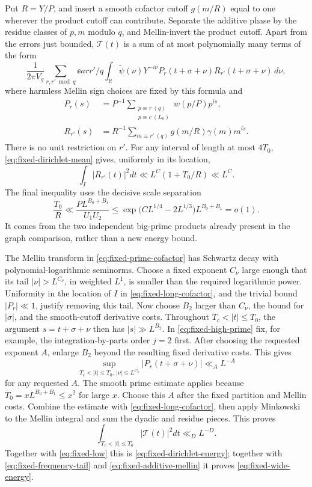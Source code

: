 Put \(R=Y/P\), and insert a smooth cofactor cutoff
\(g(m/R)\) equal to one wherever the product cutoff can contribute.
Separate the additive phase by the residue classes of \(p,m\)
modulo \(q\), and Mellin-invert the product cutoff. Apart from
the errors just bounded, \(\mathcal T(t)\) is a sum of at most
polynomially many terms of the form
\begin{equation}\label{eq:fixed-prime-cofactor}
 \frac{1}{2\pi V_g}\sum_{r,r'\bmod q}\ee{arr'/q}
       \int_{\mathbb R}\widetilde\psi(\nu)Y^{-i\nu}
          P_r(t+\sigma+\nu)R_{r'}(t+\sigma+\nu)\,d\nu,
\end{equation}
where harmless Mellin sign choices are fixed by this formula and
\[
 \begin{split}
 P_r(s)&=P^{-1}\sum_{\substack{p\equiv r\ (q)\\p\equiv c\ (L_0)}}
                    w(p/P)p^{is},\\
 R_{r'}(s)&=R^{-1}\sum_{m\equiv r'\ (q)}
                      g(m/R)\gamma(m)m^{is}.
 \end{split}
\]
There is no unit restriction on \(r'\). For any interval of
length at most \(4T_0\), \eqref{eq:fixed-dirichlet-mean} gives,
uniformly in its location,
\begin{equation}\label{eq:fixed-long-cofactor}
       \int_I|R_{r'}(t)|^2dt\ll L^C(1+T_0/R)\ll L^C.
\end{equation}
The final inequality uses the decisive scale separation
\[
 \frac{T_0}{R}\ll\frac{P L^{B_0+B_1}}{U_1U_2}
   \le\exp\bigl(CL^{1/4}-2L^{1/3}\bigr)L^{B_0+B_1}=o(1).
\]
It comes from the two independent big-prime products already
present in the graph comparison, rather than a new energy bound.

The Mellin transform in \eqref{eq:fixed-prime-cofactor} has
Schwartz decay with polynomial-logarithmic seminorms. Choose a
fixed exponent \(C_\nu\) large enough that its tail
\(|\nu|>L^{C_\nu}\), in weighted \(L^1\), is smaller than the
required logarithmic power. Uniformity in the location of \(I\)
in \eqref{eq:fixed-long-cofactor}, and the trivial bound
\(|P_r|\ll1\), justify removing this tail. Now choose \(B_2\)
larger than \(C_\nu\), the bound for \(|\sigma|\), and the
smooth-cutoff derivative costs. Throughout
\(T_c<|t|\le T_0\), the argument
\(s=t+\sigma+\nu\) then has \(|s|\gg L^{B_2}\).
In \eqref{eq:fixed-high-prime} fix, for example, the
integration-by-parts order \(j=2\) first. After choosing the
requested exponent \(A\), enlarge \(B_2\) beyond the resulting
fixed derivative costs. This gives
\[
           \sup_{T_c<|t|\le T_0,\ |\nu|\le L^{C_\nu}}
                    |P_r(t+\sigma+\nu)|\ll_A L^{-A}
\]
for any requested \(A\). The smooth prime estimate applies
because \(T_0=xL^{B_0+B_1}\le x^2\) for large \(x\).
Choose this \(A\) after the fixed partition and Mellin costs.
Combine the estimate with \eqref{eq:fixed-long-cofactor}, then apply
Minkowski to the Mellin integral and sum the dyadic and residue
pieces. This proves
\[
              \int_{T_c<|t|\le T_0}|\mathcal T(t)|^2dt\ll_D L^{-D}.
\]
Together with \eqref{eq:fixed-low} this is
\eqref{eq:fixed-dirichlet-energy}; together with
\eqref{eq:fixed-frequency-tail} and
\eqref{eq:fixed-additive-mellin} it proves
\eqref{eq:fixed-wide-energy}.

